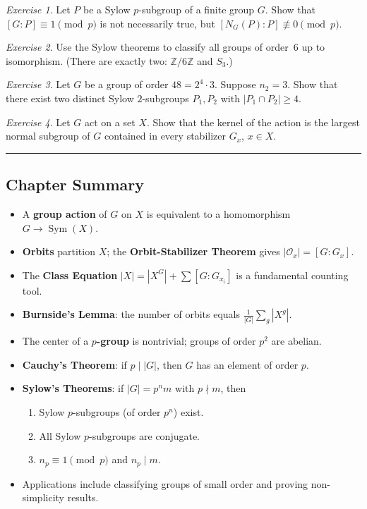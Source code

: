 \documentclass[12pt,a4paper,openany]{book}
\theoremstyle{definition}
\theoremstyle{remark}
\newtheorem{exercise}{Exercise}[chapter]
\newcommand{\Z}{\mathbb{Z}}
\DeclareMathOperator{\Sym}{Sym}
\begin{document}
\begin{exercise}\label{exo:sylow-index}
Let $P$ be a Sylow $p$-subgroup of a finite group $G$.  Show that
$[G:P]\equiv 1\pmod{p}$ is not necessarily true, but
$[N_G(P):P]\not\equiv 0\pmod{p}$.
\end{exercise}

\begin{exercise}\label{exo:classify-order-6}
Use the Sylow theorems to classify all groups of order~$6$ up to
isomorphism.  (There are exactly two: $\Z/6\Z$ and $S_3$.)
\end{exercise}

\begin{exercise}\label{exo:sylow-intersections}
Let $G$ be a group of order $48=2^4\cdot 3$.  Suppose $n_2=3$.  Show
that there exist two distinct Sylow $2$-subgroups $P_1,P_2$ with
$|P_1\cap P_2|\ge 4$.
\end{exercise}

\begin{exercise}\label{exo:group-action-hom-ker}
Let $G$ act on a set $X$.  Show that the kernel of the action is the
largest normal subgroup of $G$ contained in every stabilizer $G_x$,
$x\in X$.
\end{exercise}

\bigskip
\begin{center}\rule{0.5\textwidth}{0.4pt}\end{center}
\subsection*{Chapter Summary}

\begin{itemize}
\item A \textbf{group action} of $G$ on $X$ is equivalent to a
  homomorphism $G\to\Sym(X)$.
\item \textbf{Orbits} partition $X$; the \textbf{Orbit-Stabilizer
  Theorem} gives $|\mathcal{O}_x|=[G:G_x]$.
\item The \textbf{Class Equation}
  $|X|=|X^G|+\sum[G:G_{x_i}]$ is a fundamental counting tool.
\item \textbf{Burnside's Lemma}: the number of orbits equals
  $\frac{1}{|G|}\sum_{g}|X^g|$.
\item The center of a \textbf{$p$-group} is nontrivial; groups of
  order $p^2$ are abelian.
\item \textbf{Cauchy's Theorem}: if $p\mid|G|$, then $G$ has an
  element of order $p$.
\item \textbf{Sylow's Theorems}: if $|G|=p^n m$ with $p\nmid m$, then
  \begin{enumerate}
  \item Sylow $p$-subgroups (of order $p^n$) exist.
  \item All Sylow $p$-subgroups are conjugate.
  \item $n_p\equiv 1\pmod{p}$ and $n_p\mid m$.
  \end{enumerate}
\item Applications include classifying groups of small order and
  proving non-simplicity results.
\end{itemize}
\end{document}
